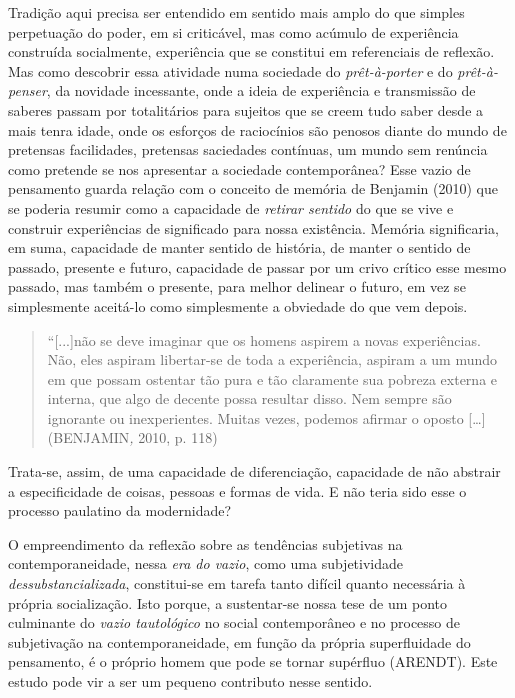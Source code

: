 Tradição aqui precisa ser entendido em sentido mais amplo do que simples
perpetuação do poder, em si criticável, mas como acúmulo de experiência
construída socialmente, experiência que se constitui em referenciais de
reflexão. Mas como descobrir essa atividade numa sociedade do
\emph{prêt-à-porter} e do \emph{prêt-à-penser}, da novidade incessante,
onde a ideia de experiência e transmissão de saberes passam por
totalitários para sujeitos que se creem tudo saber desde a mais tenra
idade, onde os esforços de raciocínios são penosos diante do mundo de
pretensas facilidades, pretensas saciedades contínuas, um mundo sem
renúncia como pretende se nos apresentar a sociedade contemporânea? Esse
vazio de pensamento guarda relação com o conceito de memória de Benjamin
(2010) que se poderia resumir como a capacidade de \emph{retirar
sentido} do que se vive e construir experiências de significado para
nossa existência. Memória significaria, em suma, capacidade de manter
sentido de história, de manter o sentido de passado, presente e futuro,
capacidade de passar por um crivo crítico esse mesmo passado, mas também
o presente, para melhor delinear o futuro, em vez se simplesmente
aceitá-lo como simplesmente a obviedade do que vem depois.

\begin{quote}
``{[}...{]}não se deve imaginar que os homens aspirem a novas
experiências. Não, eles aspiram libertar-se de toda a experiência,
aspiram a um mundo em que possam ostentar tão pura e tão claramente sua
pobreza externa e interna, que algo de decente possa resultar disso. Nem
sempre são ignorante ou inexperientes. Muitas vezes, podemos afirmar o
oposto {[}\ldots{}{]} (BENJAMIN\emph{,} 2010, p. 118)
\end{quote}

Trata-se, assim, de uma capacidade de diferenciação, capacidade de não
abstrair a especificidade de coisas, pessoas e formas de vida. E não
teria sido esse o processo paulatino da modernidade?

O empreendimento da reflexão sobre as tendências subjetivas na
contemporaneidade, nessa \emph{era do vazio}, como uma subjetividade
\emph{dessubstancializada}, constitui-se em tarefa tanto difícil quanto
necessária à própria socialização. Isto porque, a sustentar-se nossa
tese de um ponto culminante do \emph{vazio tautológico} no social
contemporâneo e no processo de subjetivação na contemporaneidade, em
função da própria superfluidade do pensamento, é o próprio homem que
pode se tornar supérfluo (ARENDT). Este estudo pode vir a ser um pequeno
contributo nesse sentido.


